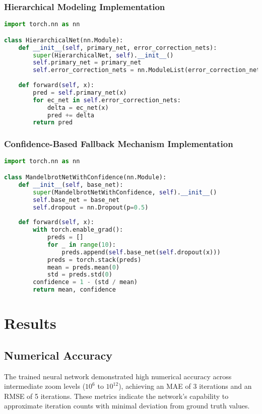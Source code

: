 \documentclass[journal]{IEEEaccess}
\begin{document}
\subsubsection{Hierarchical Modeling Implementation}
\begin{lstlisting}[language=Python, caption=Hierarchical Network Model]
import torch.nn as nn

class HierarchicalNet(nn.Module):
    def __init__(self, primary_net, error_correction_nets):
        super(HierarchicalNet, self).__init__()
        self.primary_net = primary_net
        self.error_correction_nets = nn.ModuleList(error_correction_nets)
    
    def forward(self, x):
        pred = self.primary_net(x)
        for ec_net in self.error_correction_nets:
            delta = ec_net(x)
            pred += delta
        return pred
\end{lstlisting}

\subsubsection{Confidence-Based Fallback Mechanism Implementation}
\begin{lstlisting}[language=Python, caption=Confidence-Based Neural Network with Dropout]
import torch.nn as nn

class MandelbrotNetWithConfidence(nn.Module):
    def __init__(self, base_net):
        super(MandelbrotNetWithConfidence, self).__init__()
        self.base_net = base_net
        self.dropout = nn.Dropout(p=0.5)
    
    def forward(self, x):
        with torch.enable_grad():
            preds = []
            for _ in range(10):
                preds.append(self.base_net(self.dropout(x)))
            preds = torch.stack(preds)
            mean = preds.mean(0)
            std = preds.std(0)
        confidence = 1 - (std / mean)
        return mean, confidence
\end{lstlisting}

\section{Results}
\label{sec:results}
\subsection{Numerical Accuracy}
The trained neural network demonstrated high numerical accuracy across intermediate zoom levels (\(10^6\) to \(10^{12}\)), achieving an MAE of 3 iterations and an RMSE of 5 iterations. These metrics indicate the network's capability to approximate iteration counts with minimal deviation from ground truth values.
\end{document}
